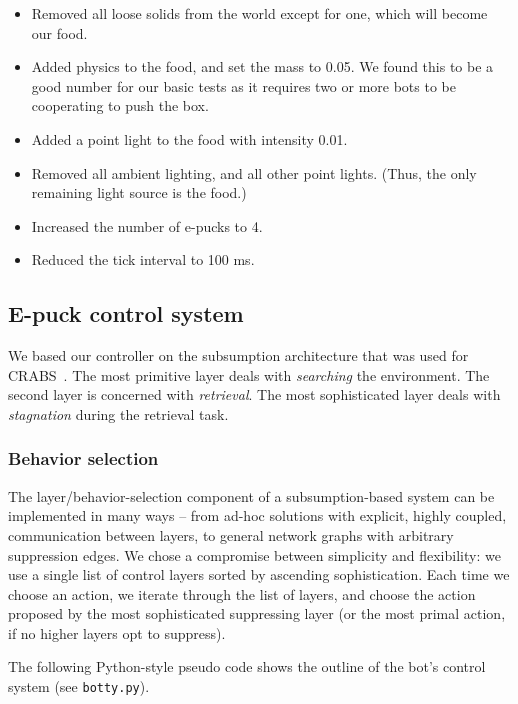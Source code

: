 \documentclass[a4paper,10pt]{article}
\newcommand{\numbots}{4}
\newcommand{\foodmass}{0.05}
\newcommand{\lightintensity}{0.01}
\newcommand{\tickinterval}{100 ms}
\begin{document}
\begin{itemize}
    \item Removed all loose solids from the world except for one, which will
    become our food.
    \item Added physics to the food, and set the mass to \foodmass.
    We found this to be a good number for our basic tests as it
    requires two or more bots to be cooperating to push the box.
    \item Added a point light to the food with intensity \lightintensity.
    \item Removed all ambient lighting, and all other point lights. (Thus, the
    only remaining light source is the food.)
    \item Increased the number of e-pucks to \numbots.
    \item Reduced the tick interval to \tickinterval.
\end{itemize}


\subsection{E-puck control system}
\label{sec:a2}

We based our controller on the subsumption architecture that was used for
CRABS~\cite{berg2011}. The most primitive layer deals with \emph{searching}
the environment. The second layer is concerned with \emph{retrieval}. The most
sophisticated layer deals with \emph{stagnation} during the retrieval task.

\subsubsection{Behavior selection}
The layer/behavior-selection component of a subsumption-based system can be
implemented in many ways -- from ad-hoc solutions with explicit, highly
coupled, communication between layers, to general network graphs with
arbitrary suppression edges. We chose a compromise between simplicity and
flexibility: we use a single list of control layers sorted by ascending
sophistication. Each time we choose an action, we iterate through the list of
layers, and choose the action proposed by the most sophisticated suppressing
layer (or the most primal action, if no higher layers opt to suppress). 

The following Python-style pseudo code shows the outline of the
bot's control system (see \texttt{botty.py}).
\end{document}
